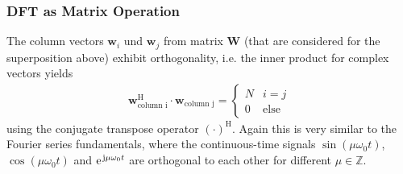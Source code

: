 \documentclass[11pt,a4paper,DIV=12]{scrartcl}
\begin{document}
\subsubsection{DFT as Matrix Operation}
%
The column vectors $\bm{w}_i$ und $\bm{w}_j$ from matrix $\bm{W}$ (that are
considered for the superposition above) exhibit orthogonality,
i.e. the inner product for complex vectors yields
\begin{align}
\bm{w}_{\text{column i}}^\text{H} \cdot \bm{w}_\text{column j} =
\begin{cases}
N & i=j\\
0 & \text{else}
\end{cases}
\end{align}
using the conjugate transpose operator $(\cdot)^\text{H}$.
%
Again this is very similar to the Fourier series fundamentals, where the
continuous-time signals
$\sin(\mu \omega_0 t)$, $\cos(\mu \omega_0 t)$ and $\e^{\im \mu \omega_0 t}$
are orthogonal to each other for different $\mu\in\mathbb{Z}$.
%
\end{document}
